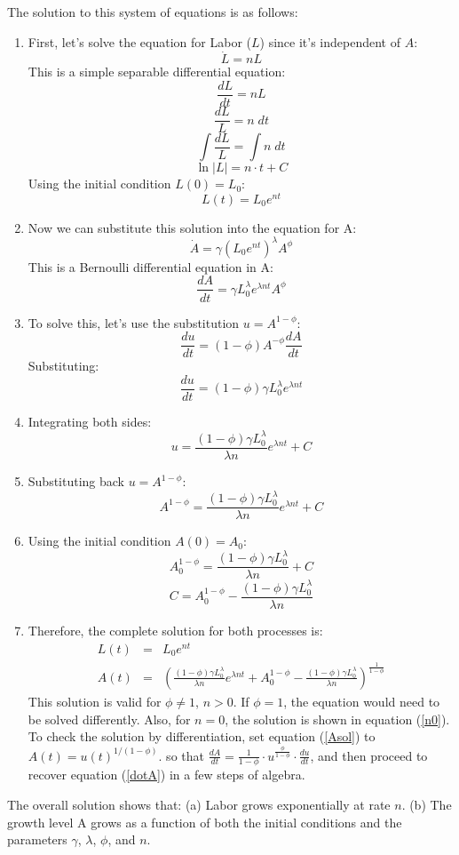 \documentclass[conference]{IEEEtran}
\begin{document}
The solution to this system of equations is as follows:
\begin{enumerate}
\item First, let's solve the equation for Labor ($L$) since it's independent of $A$:
$$ \dot{L} = nL $$
This is a simple separable differential equation:
$$ \frac{dL}{dt} = nL $$
$$ \frac{dL}{L} = n \; dt $$
$$ \int \frac{dL}{L} = \int n \; dt $$
$$ \ln|L| = n \cdot t + C $$
Using the initial condition $L(0) = L_0$:
$$ L(t) = L_0e^{nt} $$  
\item 
Now we can substitute this solution into the equation for A:
$$ \dot{A} = \gamma(L_0e^{nt})^\lambda A^\phi $$
This is a Bernoulli differential equation in A:
$$ \frac{dA}{dt} = \gamma L_0^\lambda e^{\lambda nt}A^\phi $$
\item To solve this, let's use the substitution $u = A^{1-\phi}$:
$$ \frac{du}{dt} = (1-\phi)A^{-\phi}\frac{dA}{dt} $$
Substituting:
$$ \frac{du}{dt} = (1-\phi)\gamma L_0^\lambda e^{\lambda nt} $$
\item 
Integrating both sides:
$$ u = \frac{(1-\phi)\gamma L_0^\lambda}{\lambda n}e^{\lambda nt} + C $$
\item 
Substituting back $u = A^{1-\phi}$:
$$ A^{1-\phi} = \frac{(1-\phi)\gamma L_0^\lambda}{\lambda n}e^{\lambda nt} + C $$
\item 
Using the initial condition $A(0) = A_0$:
$$ A_0^{1-\phi} = \frac{(1-\phi)\gamma L_0^\lambda}{\lambda n} + C $$
$$ C = A_0^{1-\phi} - \frac{(1-\phi)\gamma L_0^\lambda}{\lambda n} $$
\item 
Therefore, the complete solution for both processes is:
{\small
\begin{eqnarray}
L(t) &=& L_0e^{nt} \label{Lsol}\\
A(t) &=& \left(\frac{(1-\phi)\gamma L_0^\lambda}{\lambda n}e^{\lambda nt} + A_0^{1-\phi} - \frac{(1-\phi)\gamma L_0^\lambda}{\lambda n}\right)^{\frac{1}{1-\phi}}  \label{Asol}
\end{eqnarray}
}
This solution is valid for $\phi \neq 1$, $n>0$. If $\phi = 1$, the equation would need to be solved differently. Also, for $n=0$, the solution is shown in equation (\ref{n0}). To check the solution by differentiation, set equation (\ref{Asol}) to $A(t)=u(t)^{1/(1-\phi)}$. so that $\frac{dA}{dt}=\frac{1}{1-\phi} \cdot u^{\frac{\phi}{1-\phi}} \cdot \frac{du}{dt}$, and then proceed to recover equation (\ref{dotA}) in a few steps of algebra. 
\end{enumerate}
The overall solution shows that: (a) Labor grows exponentially at rate $n$. (b) The growth level A grows as a function of both the initial conditions and the parameters $\gamma$, $\lambda$, $\phi$, and $n$.
\end{document}
